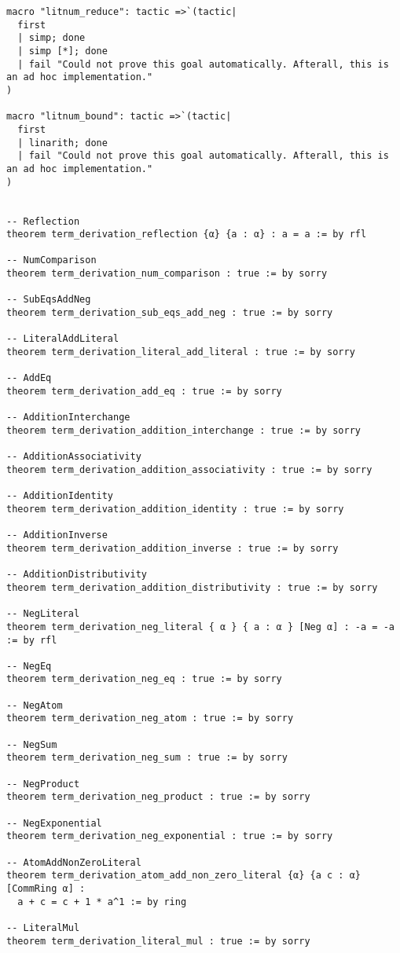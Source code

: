 \documentclass{article}
\begin{document}
\begin{tcolorbox}[colback=white!10, width=\linewidth]
\begin{lstlisting}[language=Lean4]
macro "litnum_reduce": tactic =>`(tactic|
  first
  | simp; done
  | simp [*]; done
  | fail "Could not prove this goal automatically. Afterall, this is an ad hoc implementation."
)

macro "litnum_bound": tactic =>`(tactic|
  first
  | linarith; done
  | fail "Could not prove this goal automatically. Afterall, this is an ad hoc implementation."
)


-- Reflection
theorem term_derivation_reflection {α} {a : α} : a = a := by rfl

-- NumComparison
theorem term_derivation_num_comparison : true := by sorry

-- SubEqsAddNeg
theorem term_derivation_sub_eqs_add_neg : true := by sorry

-- LiteralAddLiteral
theorem term_derivation_literal_add_literal : true := by sorry

-- AddEq
theorem term_derivation_add_eq : true := by sorry

-- AdditionInterchange
theorem term_derivation_addition_interchange : true := by sorry

-- AdditionAssociativity
theorem term_derivation_addition_associativity : true := by sorry

-- AdditionIdentity
theorem term_derivation_addition_identity : true := by sorry

-- AdditionInverse
theorem term_derivation_addition_inverse : true := by sorry

-- AdditionDistributivity
theorem term_derivation_addition_distributivity : true := by sorry

-- NegLiteral
theorem term_derivation_neg_literal { α } { a : α } [Neg α] : -a = -a := by rfl

-- NegEq
theorem term_derivation_neg_eq : true := by sorry

-- NegAtom
theorem term_derivation_neg_atom : true := by sorry

-- NegSum
theorem term_derivation_neg_sum : true := by sorry

-- NegProduct
theorem term_derivation_neg_product : true := by sorry

-- NegExponential
theorem term_derivation_neg_exponential : true := by sorry

-- AtomAddNonZeroLiteral
theorem term_derivation_atom_add_non_zero_literal {α} {a c : α} [CommRing α] : 
  a + c = c + 1 * a^1 := by ring

-- LiteralMul
theorem term_derivation_literal_mul : true := by sorry


\end{lstlisting}
\end{tcolorbox}
\end{document}
